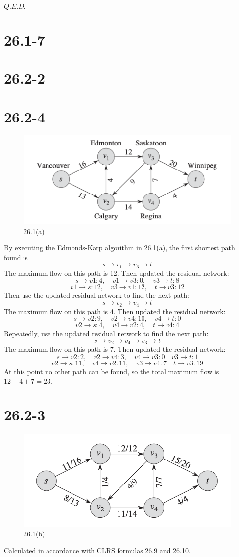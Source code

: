 \documentclass[12pt]{article}
\begin{document}
$Q.E.D.$

\section{26.1-7}

\section{26.2-2}

\section{26.2-4}
\begin{figure}[h]
    \centering
    \includegraphics[width=0.5\linewidth]{截屏2024-11-18 下午8.43.56.png}
    \caption{26.1(a)}
    \label{fig:26.1(a)}
\end{figure}
By executing the Edmonds-Karp algorithm in 26.1(a), the first shortest path found is 
\[s \rightarrow v_1 \rightarrow v_3 \rightarrow t\]
The maximum flow on this path is 12.
Then updated the residual network:
\[s \rightarrow v1: 4, \quad v1 \rightarrow v3: 0, \quad v3 \rightarrow t: 8\]
\[v1 \rightarrow s: 12, \quad v3 \rightarrow v1: 12, \quad t \rightarrow v3: 12\]
Then use the updated residual network to find the next path:
\[s  \rightarrow v_2 \rightarrow v_4 \rightarrow t\]
The maximum flow on this path is 4.
Then updated the residual network:
\[s \rightarrow v2: 9, \quad v2 \rightarrow v4: 10, \quad v4 \rightarrow t: 0 \]
\[v2 \rightarrow s: 4, \quad v4 \rightarrow v2: 4, \quad t \rightarrow v4: 4 \]
Repeatedly, use the updated residual network to find the next path:
\[s \rightarrow v_2 \rightarrow v_4  \rightarrow v_3 \rightarrow t\]
The maximum flow on this path is 7.
Then updated the residual network:
\[s \rightarrow v2: 2, \quad v2 \rightarrow v4: 3, \quad v4 \rightarrow v3: 0 \quad v3 \rightarrow t: 1\]
\[v2 \rightarrow s: 11, \quad v4 \rightarrow v2: 11, \quad v3 \rightarrow v4: 7 \quad t \rightarrow v3: 19\]
At this point no other path can be found, so the total maximum flow is \(12+4+7=23\).
\section{26.2-3}
\begin{figure}[h]
    \centering
    \includegraphics[width=0.5\linewidth]{截屏2024-11-18 下午8.46.37.png}
    \caption{26.1(b)}
    \label{fig:enter-label}

\end{figure}
Calculated in accordance with CLRS formulas 26.9 and 26.10.
\end{document}
